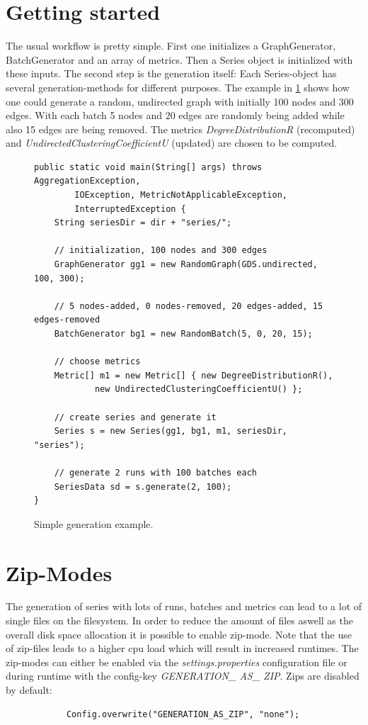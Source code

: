 \section{Getting started}
The usual workflow is pretty simple. First one initializes a GraphGenerator, BatchGenerator and an array of metrics. Then a Series object is initialized with these inputs. The second step is the generation itself: Each Series-object has several generation-methods for different purposes. The example in \ref{code:example1} shows how one could generate a random, undirected graph with initially 100 nodes and 300 edges. With each batch 5 nodes and 20 edges are randomly being added while also 15 edges are being removed. The metrics \textit{DegreeDistributionR} (recomputed) and \textit{UndirectedClusteringCoefficientU} (updated) are chosen to be computed. 

\begin{figure} [h]
\begin{lstlisting}
public static void main(String[] args) throws AggregationException,
		IOException, MetricNotApplicableException,
		InterruptedException {
	String seriesDir = dir + "series/";

	// initialization, 100 nodes and 300 edges
	GraphGenerator gg1 = new RandomGraph(GDS.undirected, 100, 300);
	
	// 5 nodes-added, 0 nodes-removed, 20 edges-added, 15 edges-removed
	BatchGenerator bg1 = new RandomBatch(5, 0, 20, 15);
	
	// choose metrics
	Metric[] m1 = new Metric[] { new DegreeDistributionR(),
			new UndirectedClusteringCoefficientU() };

	// create series and generate it
	Series s = new Series(gg1, bg1, m1, seriesDir, "series");
	
	// generate 2 runs with 100 batches each
	SeriesData sd = s.generate(2, 100);
}
\end{lstlisting}
\caption{Simple generation example.}
\label{code:example1}
\end{figure}

\section{Zip-Modes}
The generation of series with lots of runs, batches and metrics can lead to a lot of single files on the filesystem. In order to reduce the amount of files aswell as the overall disk space allocation it is possible to enable zip-mode. Note that the use of zip-files leads to a higher cpu load which will result in increased runtimes. The zip-modes can either be enabled via the \textit{settings.properties} configuration file or during runtime with the config-key \textit{GENERATION\_ AS\_ ZIP}. Zips are disabled by default:
\begin{lstlisting}
			Config.overwrite("GENERATION_AS_ZIP", "none");
\end{lstlisting}


